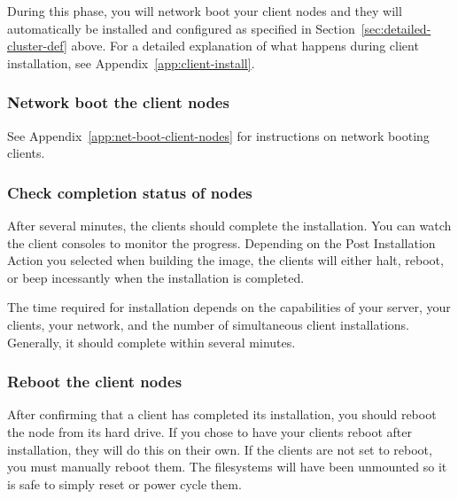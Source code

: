 During this phase, you will network boot your client nodes and they
will automatically be installed and configured as specified in
Section~\ref{sec:detailed-cluster-def} above. For a detailed
explanation of what happens during client installation, see
Appendix~\ref{app:client-install}.


\subsubsection{Network boot the client nodes}

See Appendix~\ref{app:net-boot-client-nodes} for instructions on
network booting clients.


\subsubsection{Check completion status of nodes}
\label{det:clientfinish}

After several minutes, the clients should complete the installation.
You can watch the client consoles to monitor the progress. Depending
on the Post Installation Action you selected when building the image,
the clients will either halt, reboot, or beep incessantly when the
installation is completed.

The time required for installation depends on the capabilities of your
server, your clients, your network, and the number of simultaneous
client installations.  Generally, it should complete within several
minutes.
  

\subsubsection{Reboot the client nodes}

After confirming that a client has completed its installation, you
should reboot the node from its hard drive. If you chose to have your
clients reboot after installation, they will do this on their
own. If the clients are not set to reboot, you must manually
reboot them. The filesystems will have been unmounted so it is safe
to simply reset or power cycle them.



